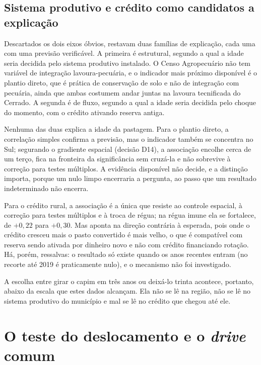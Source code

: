 \subsection{Sistema produtivo e crédito como candidatos a explicação}

Descartados os dois eixos óbvios, restavam duas famílias de explicação, cada
uma com uma previsão verificável. A primeira é estrutural, segundo a qual a idade seria
decidida pelo sistema produtivo instalado. O Censo Agropecuário não tem
variável de integração lavoura-pecuária, e o indicador mais próximo
disponível é o plantio direto, que é prática de conservação de solo e não
de integração com pecuária, ainda que ambas costumem andar juntas na
lavoura tecnificada do Cerrado. A segunda é de fluxo, segundo a qual a idade seria decidida
pelo choque do momento, com o crédito ativando reserva antiga.

Nenhuma das duas explica a idade da pastagem. Para o plantio direto, a
correlação simples confirma a previsão, mas o indicador também se concentra no
Sul; segurando o gradiente espacial (decisão D14), a associação encolhe cerca
de um terço, fica na fronteira da significância sem cruzá-la e não sobrevive à
correção para testes múltiplos. A evidência disponível não decide, e a
distinção importa, porque um nulo limpo encerraria a pergunta, ao passo que um
resultado indeterminado não encerra.

Para o crédito rural, a associação é a única que resiste ao controle espacial,
à correção para testes múltiplos e à troca de régua; na régua imune ela se
fortalece, de $+0{,}22$ para $+0{,}30$. Mas aponta na direção contrária à
esperada, pois onde o crédito cresceu mais o pasto convertido é mais velho, o que
é compatível com reserva sendo ativada por dinheiro novo e não com crédito
financiando rotação. Há, porém, ressalvas: o resultado só existe quando os
anos recentes entram (no recorte até 2019 é praticamente nulo), e o mecanismo
não foi investigado.

A escolha entre girar o capim em três anos ou deixá-lo trinta acontece,
portanto, abaixo da escala que estes dados alcançam. Ela não se lê na região,
não se lê no sistema produtivo do município e mal se lê no crédito que chegou
até ele.

\section{O teste do deslocamento e o \emph{drive} comum}
\label{sec:res-perna3}

